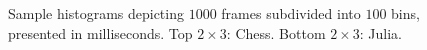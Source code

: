 \begin{figure}
  \setlength{\abovecaptionskip}{-5pt}
  \setlength{\belowcaptionskip}{0pt}
  \centering
  
  
  \caption{Sample histograms depicting $1000$ frames subdivided into $100$ bins, presented in milliseconds. Top $2\times3$: Chess. Bottom $2\times3$: Julia.}
  \label{fig:histogram}
\end{figure}
